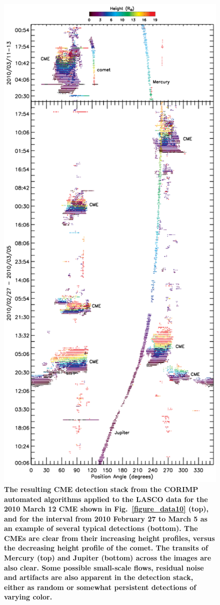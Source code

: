 \documentclass[preprint2]{aastex}
\begin{document}
\begin{figure}[!p]
\centerline{\includegraphics[scale=0.35, clip=true, trim=0 120 0 100]{figure_twostack.eps}}
\caption{{\bf The resulting CME detection stack from the CORIMP automated algorithms applied to the LASCO data for the 2010 March 12 CME shown in Fig.~\ref{figure_data10} (top), and for the interval from 2010 February 27 to March 5 as an example of several typical detections (bottom). The CMEs are clear from their increasing height profiles, versus the decreasing height profile of the comet. The transits of Mercury (top) and Jupiter (bottom) across the images are also clear. Some possible small-scale flows, residual noise and artifacts are also apparent in the detection stack, either as random or somewhat persistent detections of varying color.}}
\label{figure_twostack}
\end{figure}
\end{document}
